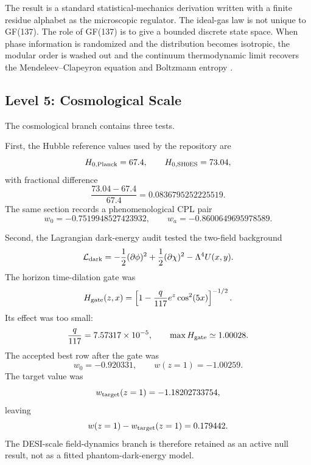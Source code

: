 \documentclass[11pt]{article}
\begin{document}
The result is a standard statistical-mechanics derivation written with a
finite residue alphabet as the microscopic regulator.  The ideal-gas law is
not unique to GF(137).  The role of GF(137) is to give a bounded discrete
state space.  When phase information is randomized and the distribution becomes
isotropic, the modular order is washed out and the continuum thermodynamic
limit recovers the Mendeleev--Clapeyron equation and Boltzmann entropy
\cite{boltzmann1896,gibbs1902}.

\subsection{Level 5: Cosmological Scale}

The cosmological branch contains three tests.

First, the Hubble reference values used by the repository are
\begin{equation}
    H_{0,\rm Planck}=67.4,
    \qquad
    H_{0,\rm SH0ES}=73.04,
\end{equation}
with fractional difference
\begin{equation}
    \frac{73.04-67.4}{67.4}=0.0836795252225519.
\end{equation}
The same section records a phenomenological CPL pair
\begin{equation}
    w_0=-0.7519948527423932,
    \qquad
    w_a=-0.8600649695978589.
\end{equation}

Second, the Lagrangian dark-energy audit tested the two-field background
\begin{equation}
    \mathcal{L}_{\rm dark}
    =
    -\frac{1}{2}(\partial\phi)^2
    +\frac{1}{2}(\partial\chi)^2
    -\Lambda^4U(x,y).
\end{equation}
The horizon time-dilation gate was
\begin{equation}
    H_{\rm gate}(z,x)
    =
    \left[
        1-\frac{q}{117}e^z\cos^2(5x)
    \right]^{-1/2}.
\end{equation}
Its effect was too small:
\begin{equation}
    \frac{q}{117}=7.57317\times10^{-5},
    \qquad
    \max H_{\rm gate}\simeq1.00028.
\end{equation}
The accepted best row after the gate was
\begin{equation}
    w_0=-0.920331,\qquad w(z=1)=-1.00259.
\end{equation}
The target value was
\begin{equation}
    w_{\rm target}(z=1)=-1.18202733754,
\end{equation}
leaving
\begin{equation}
    w(z=1)-w_{\rm target}(z=1)=0.179442.
\end{equation}
The DESI-scale field-dynamics branch is therefore retained as an active
null result, not as a fitted phantom-dark-energy model.
\end{document}
